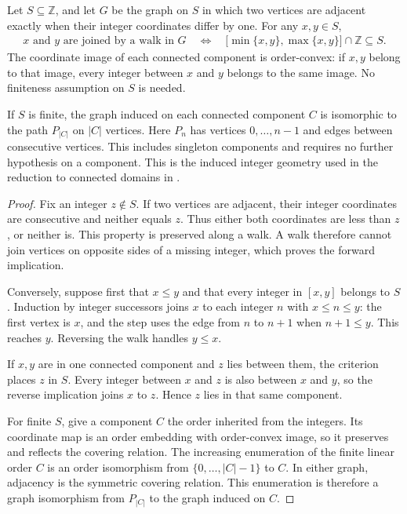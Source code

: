 \begin{lemma}
    \label{thm:chain_integer_domain_components}
    \leanok
    Let $S\subseteq\mathbb Z$, and let $G$ be the graph on $S$ in which two
    vertices are adjacent exactly when their integer coordinates differ by one.
    For any $x,y\in S$,
    \begin{align}
        x\text{ and }y\text{ are joined by a walk in }G
        \quad\Longleftrightarrow\quad
        \lbrack\min\{x,y\},\max\{x,y\}\rbrack\cap\mathbb Z\subseteq S.
    \end{align}
    The coordinate image of each connected component is order-convex:
    if $x,y$ belong to that image, every integer between $x$ and $y$ belongs to
    the same image. No finiteness assumption on $S$ is needed.

    If $S$ is finite, the graph induced on each connected component $C$ is
    isomorphic to the path $P_{|C|}$ on $|C|$ vertices. Here $P_n$ has vertices
    $0,\ldots,n-1$ and edges between consecutive vertices. This includes
    singleton components and requires no further hypothesis on a component.
    This is the induced integer geometry used in the reduction to connected
    domains in \cite[Part~I]{TNLean2026OneDimensional}.
\end{lemma}
\begin{proof}
    \leanok
    Fix an integer $z\notin S$. If two vertices are adjacent, their integer
    coordinates are consecutive and neither equals $z$. Thus either both
    coordinates are less than $z$, or neither is. This property is preserved
    along a walk. A walk therefore cannot join vertices on opposite sides of
    a missing integer, which proves the forward implication.

    Conversely, suppose first that $x\le y$ and that every integer in $[x,y]$
    belongs to $S$. Induction by integer successors joins $x$ to each integer
    $n$ with $x\le n\le y$: the first vertex is $x$, and the step uses the
    edge from $n$ to $n+1$ when $n+1\le y$. This reaches $y$. Reversing the
    walk handles $y\le x$.

    If $x,y$ are in one connected component and $z$ lies between them, the
    criterion places $z$ in $S$. Every integer between $x$ and $z$ is also
    between $x$ and $y$, so the reverse implication joins $x$ to $z$. Hence
    $z$ lies in that same component.

    For finite $S$, give a component $C$ the order inherited from the integers.
    Its coordinate map is an order embedding with order-convex image, so it
    preserves and reflects the covering relation. The increasing enumeration
    of the finite linear order $C$ is an order isomorphism from
    $\{0,\ldots,|C|-1\}$ to $C$. In either graph, adjacency is the symmetric
    covering relation. This enumeration is therefore a graph isomorphism
    from $P_{|C|}$ to the graph induced on $C$.
\end{proof}

